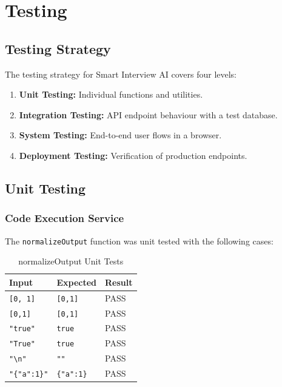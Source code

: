 \chapter{Testing}

\section{Testing Strategy}

The testing strategy for Smart Interview AI covers four levels:
\begin{enumerate}
    \item \textbf{Unit Testing:} Individual functions and utilities.
    \item \textbf{Integration Testing:} API endpoint behaviour with a test database.
    \item \textbf{System Testing:} End-to-end user flows in a browser.
    \item \textbf{Deployment Testing:} Verification of production endpoints.
\end{enumerate}

\section{Unit Testing}

\subsection{Code Execution Service}

The \texttt{normalizeOutput} function was unit tested with the following cases:

\begin{table}[H]
\centering
\caption{normalizeOutput Unit Tests}
\vspace{8pt}
\begin{tabularx}{\textwidth}{|X|X|C{2cm}|}
\hline
\textbf{Input} & \textbf{Expected} & \textbf{Result} \\
\hline
\texttt{[0, 1]} & \texttt{[0,1]} & PASS \\
\hline
\texttt{[0,1]} & \texttt{[0,1]} & PASS \\
\hline
\texttt{"true"} & \texttt{true} & PASS \\
\hline
\texttt{"True"} & \texttt{true} & PASS \\
\hline
\texttt{"\textbackslash n"} & \texttt{""} & PASS \\
\hline
\texttt{"\{"a":1\}"} & \texttt{\{"a":1\}} & PASS \\
\hline
\end{tabularx}
\label{tab:normalizetest}
\end{table}

